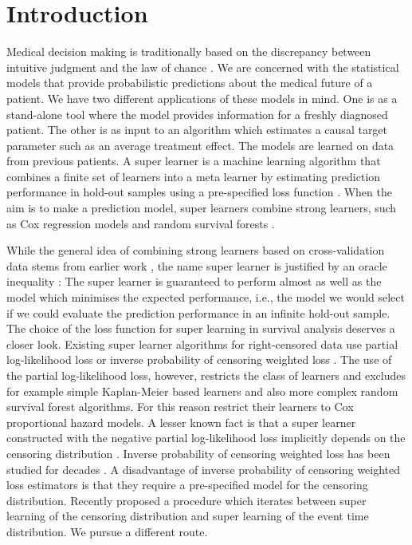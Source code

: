 \documentclass[unnumsec,webpdf,contemporary,large,namedate]{oup-authoring-template}%
\theoremstyle{thmstyleone}%
\theoremstyle{thmstyletwo}%
\theoremstyle{thmstylethree}%
\newcommand{\1}{\mathds{1}}
\begin{document}
\section{Introduction}
\label{sec:introduction}

Medical decision making is traditionally based on the discrepancy
between intuitive judgment and the law of chance
\citep{redelmeier1995probability}. We are concerned with the
statistical models that provide probabilistic predictions about the
medical future of a patient. We have two different applications of
these models in mind. One is as a stand-alone tool where the model
provides information for a freshly diagnosed patient. The other is as
input to an algorithm which estimates a causal target parameter such
as an average treatment effect. The models are learned on data from
previous patients. A super learner is a machine learning algorithm
that combines a finite set of learners into a meta learner by
estimating prediction performance in hold-out samples using a
pre-specified loss function \citep{van2007super}. When the aim is to
make a prediction model, super learners combine strong learners, such
as Cox regression models and random survival forests
\citep{gerds2021medical}.

While the general idea of combining strong learners based on
cross-validation data stems from earlier work
\citep{wolpert1992stacked,breiman1996stacked}, the name super learner
is justified by an oracle inequality
\citep{van2003unicv,vaart2006oracle}: The super learner is guaranteed
to perform almost as well as the model which minimises the expected
performance, i.e., the model we would select if we could evaluate the
prediction performance in an infinite hold-out sample. The choice of
the loss function for super learning in survival analysis deserves a
closer look. Existing super learner algorithms for right-censored data
use partial log-likelihood loss or inverse probability of censoring
weighted loss
\citep{polley2011-sl-cens,keles2004asymptotically,golmakani2020super,westling2021inference}.
The use of the partial log-likelihood loss, however, restricts the
class of learners and excludes for example simple Kaplan-Meier based
learners and also more complex random survival forest algorithms. For
this reason \cite{golmakani2020super} restrict their learners to Cox
proportional hazard models. A lesser known fact is that a super
learner constructed with the negative partial log-likelihood loss
implicitly depends on the censoring distribution
\citep{hjort1992inference,whitney2019comment}. Inverse probability of
censoring weighted loss has been studied for decades
\citep{graf1999assessment, hothorn2006survival,
  gerds2006consistent}. A disadvantage of inverse probability of
censoring weighted loss estimators is that they require a
pre-specified model for the censoring distribution. Recently
\cite{westling2021inference} proposed a procedure which iterates
between super learning of the censoring distribution and super
learning of the event time distribution. We pursue a
different route.
\end{document}
